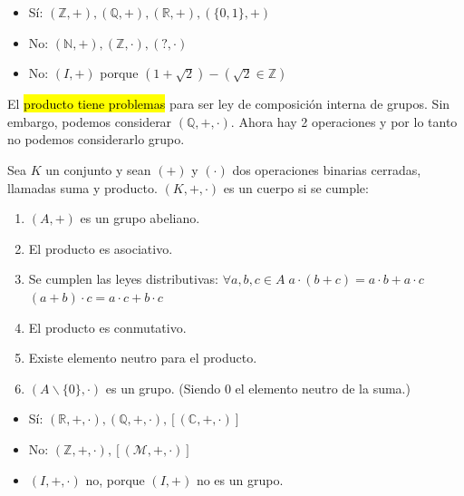 \begin{example}
	\begin{itemize}
		\item Sí: $(ℤ,+),(ℚ,+),(ℝ,+),(\{0,1\},+)$
		\item No: $(ℕ,+),(ℤ,·),(?,·)$
		\item No: $(I,+)$ porque $(1+\sqrt{2}) - (\sqrt{2}\in ℤ)$
	\end{itemize}
\end{example}


El \hl{producto tiene problemas} para ser ley de composición interna de grupos. 
%
Sin embargo, podemos considerar $(ℚ,+,·)$. 
%
Ahora hay 2 operaciones y por lo tanto no podemos considerarlo grupo.


\begin{defn}[Cuerpo] 
Sea $K$ un conjunto y sean $(+)$ y $(·)$ dos operaciones binarias cerradas, llamadas suma y producto. 
%
$(K,+,·)$ es un cuerpo si se cumple:
\begin{enumerate}
\item $(A, +)$ es un grupo abeliano.
\item El producto es asociativo.
\item Se cumplen las leyes distributivas: 
	\subitem $\forall a,b,c \in A \; a\cdot(b+c)=a\cdot b + a\cdot c$ 
	\subitem $(a+b)\cdot c= a \cdot c + b \cdot c$
\item El producto es conmutativo.
\item Existe elemento neutro para el producto.
\item $\left(A\backslash \{0\},·\right)$ es un grupo. (Siendo 0 el elemento neutro de la suma.)
\end{enumerate}
\end{defn}


\begin{example}
	\begin{itemize}
		\item Sí: $(ℝ,+,·),(ℚ,+,·),\left[(ℂ,+,·)\right]$
		\item No: $(ℤ,+,·),\left[(\mathcal{M},+,·)\right]$
		\item $\left(I,+,·\right)$ no, porque $(I,+)$ no es un grupo.
	\end{itemize}
\end{example}


